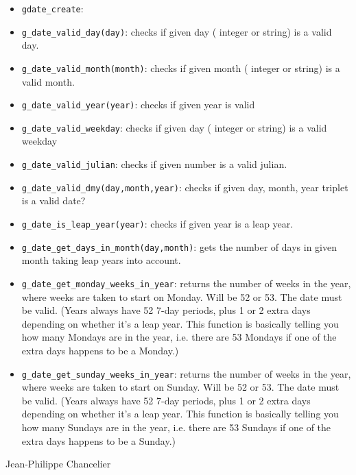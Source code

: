 \begin{itemize}
  \item \verb+gdate_create+:
  \item \verb+g_date_valid_day(day)+: checks if given day ( integer or string) is a valid day.
  \item \verb+g_date_valid_month(month)+: checks if given month ( integer or string) is a valid month.
  \item \verb+g_date_valid_year(year)+: checks if given year is valid 
  \item \verb+g_date_valid_weekday+: checks if given day ( integer or string) is a valid weekday 
  \item \verb+g_date_valid_julian+: checks if given number  is a valid julian.
  \item \verb+g_date_valid_dmy(day,month,year)+: checks if given day, month, year triplet is a valid date?
  \item \verb+g_date_is_leap_year(year)+: checks if given year is a leap year.
  \item \verb+g_date_get_days_in_month(day,month)+: gets the number of days in given month taking leap years into account.
  \item \verb+g_date_get_monday_weeks_in_year+: returns the number of weeks in the year, where weeks are taken to start on Monday. Will be 52 or 53. The date must be valid. (Years always have 52 7-day periods, plus 1 or 2 extra days depending on whether it's a leap year. This function is basically telling you how many Mondays are in the year, i.e. there are 53 Mondays if one of the extra days happens to be a Monday.)
  \item \verb+g_date_get_sunday_weeks_in_year+: returns the number of weeks in the year, where weeks are taken to start on Sunday. Will be 52 or 53. The date must be valid. (Years always have 52 7-day periods, plus 1 or 2 extra days depending on whether it's a leap year. This function is basically telling you how many Sundays are in the year, i.e. there are 53 Sundays if one of the extra days happens to be a Sunday.)
\end{itemize}

\begin{examples}
  \begin{program}
  \end{program}
 \end{examples}

\begin{authors}
  Jean-Philippe Chancelier
\end{authors}
